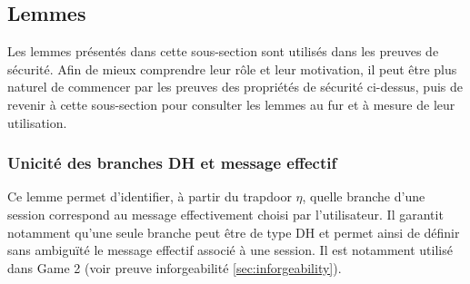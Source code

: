 \documentclass[10pt,a4paper]{article}
\theoremstyle{definition}
\theoremstyle{plain}
\theoremstyle{remark}
\begin{document}
\subsection{Lemmes}

Les lemmes présentés dans cette sous-section sont utilisés dans les preuves de sécurité. 
Afin de mieux comprendre leur rôle et leur motivation, 
il peut être plus naturel de commencer par les
preuves des propriétés de sécurité ci-dessus, puis de revenir à cette sous-section
pour consulter les lemmes au fur et à mesure de leur utilisation.

\subsubsection{Unicité des branches DH et message effectif}

Ce lemme permet d'identifier, à partir du trapdoor $\eta$, quelle branche
d'une session correspond au message effectivement choisi par l'utilisateur.
Il garantit notamment qu'une seule branche peut être de type DH et permet
ainsi de définir sans ambiguïté le message effectif associé à une session.
Il est notamment utilisé dans Game 2 (voir preuve inforgeabilité \ref{sec:inforgeability}).
\end{document}
